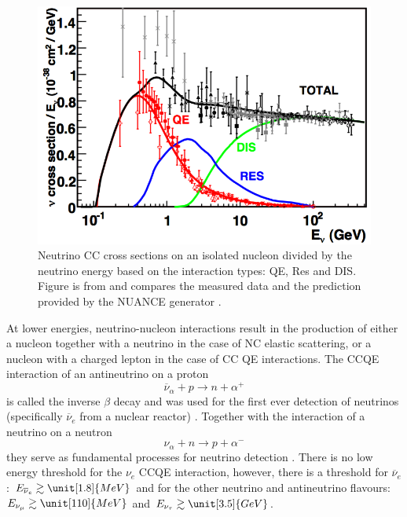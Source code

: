 \begin{figure}[hbtp]
\centering
\includegraphics[width=0.8\linewidth]{Plots/Theory/NeutrinoCCCrossSections.png}
\caption[Muon neutrino CC cross sections based on the interaction types]{Neutrino \acrshort{CC} cross sections on an isolated nucleon divided by the neutrino energy based on the interaction types: \acrfull{QE}, \acrfull{Res} and \acrfull{DIS}. Figure is from \cite{NeutrinoCCCrossSectionPlot.pdf} and compares the measured data \cite{NeutrinoIntOverview2012.pdf} and the prediction provided by the NUANCE generator \cite{NuanceNuIntSimulation2002.pdf}.}
\label{fig:NuCCCrossSection}
\end{figure}

At lower energies, neutrino-nucleon interactions result in the production of either a nucleon together with a neutrino in the case of \gls{NC} elastic scattering, or a nucleon with a charged lepton in the case of \gls{CC} \gls{QE} interactions. The \gls{CC}\gls{QE} interaction of an antineutrino on a proton
\begin{equation}\label{eq:InvBetaDecay}
\overline{\nu}_\alpha +p\rightarrow n+\alpha^+
\end{equation}
is called the inverse $\beta$ decay and was used for the first ever detection of neutrinos (specifically $\overline{\nu}_e$ from a nuclear reactor) \cite{CowanReinesFirstAttempt.pdf, CowanReinesConfirmation.pdf}. Together with the interaction of a neutrino on a neutron
\begin{equation}
\nu_\alpha+n\rightarrow p+\alpha^-
\end{equation}
they serve as fundamental processes for neutrino detection \cite{Homestake1968.pdf, MuonNeutrinoDetection.pdf, ObservationOfTauNeutrino.pdf}. There is no low energy threshold for the $\nu_e$ \gls{CC}\gls{QE} interaction, however, there is a threshold for $\overline{\nu}_e$: $E_{\overline{\nu}_e}\gtrsim\unit[1.8]{MeV}$ and for the other neutrino and antineutrino flavours: $E_{\nu_\mu}\gtrsim\unit[110]{MeV}$ and $E_{\nu_\tau}\gtrsim\unit[3.5]{GeV}$.

